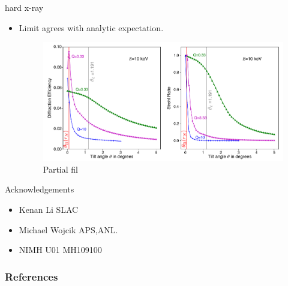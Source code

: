 \documentclass{beamer}
\begin{document}
\begin{frame}{hard x-ray}
	\begin{itemize}
		\item Limit agrees with analytic expectation.
		\begin{center}
			\begin{figure}
				\includegraphics[scale=0.275]{tilt_plot_ten}
				\caption{Partial fil}	
			\end{figure}
		\end{center}
	\end{itemize}
\end{frame}




\begin{frame}{Acknowledgements}
  \begin{itemize}
  \item \alert{Kenan Li} SLAC
  \item \alert{Michael Wojcik} APS,ANL.
  \item \alert{NIMH} U01 MH109100
  \end{itemize}
\end{frame}



\renewcommand*{\bibfont}{\scriptsize}
\begin{frame}[t, allowframebreaks]
\frametitle{References}


\end{frame}
\end{document}
